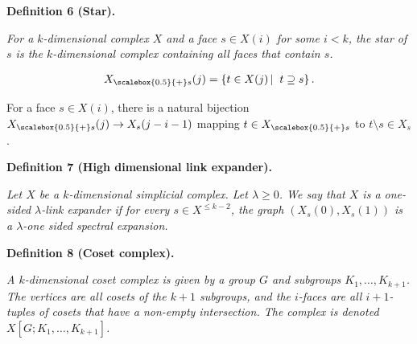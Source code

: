 \documentclass[10pt,a4paper]{article}
\begin{document}


\par\medskip\noindent\textbf{
\textbf{Definition 6}\textbf{ }(Star)\textbf{.}
}\par



\emph{For a $k$-dimensional complex $X$ and a face $s\in X(i)$ for some $i<k$, the star of $s$ is the $k$-dimensional complex containing all faces that contain $s$.}\par


\[\begin{gathered}
{X}_{\scalebox{0.5}{+}s}(j)=\left\{t\in X(j)\left|\;\vphantom{t\in X(j)t\supseteq s}\right.t\supseteq s\right\}.
\end{gathered}\]






For a face $s\in X(i)$, there is a natural bijection ${X}_{\scalebox{0.5}{+}s}(j)\to X_{s}(j-i-1)$ mapping $t\in{X}_{\scalebox{0.5}{+}s}$ to $t\setminus s\in X_{s}$.\par





\par\medskip\noindent\textbf{
\textbf{Definition 7}\textbf{ }(High dimensional link expander)\textbf{.}
}\par



\emph{Let $X$ be a $k$-dimensional simplicial complex. Let $\lambda\geq 0$. We say that $X$ is a one-sided $\lambda$-link expander if for every $s\in X^{\leq k-2}$, the graph $(X_{s}(0),X_{s}(1))$ is a $\lambda$-one sided spectral expansion.}\par







\par\medskip\noindent\textbf{
\textbf{Definition 8}\textbf{ }(Coset complex)\textbf{.}
}\par



\emph{A $k$-dimensional coset complex is given by a group $G$ and subgroups $K_{1},\ldots,K_{k+1}$. The vertices are all cosets of the $k+1$ subgroups, and the $i$-faces are all $i+1$-tuples of cosets that have a non-empty intersection. The complex is denoted
$X[G;K_{1},\ldots,K_{k+1}]$.}\par
\end{document}
